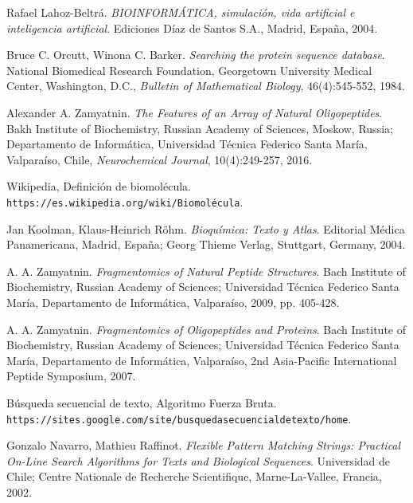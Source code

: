 \documentclass[letterpaper, 10pt, notitlepage]{report}
\begin{document}
\begin{thebibliography}{9}

Rafael Lahoz-Beltrá.
\textit{BIOINFORMÁTICA, simulación, vida artificial e inteligencia artificial}. 
Ediciones Díaz de Santos S.A., Madrid, España, 2004.

Bruce C. Orcutt, Winona C. Barker.
\textit{Searching the protein sequence database}.
National Biomedical Research Foundation, Georgetown University Medical Center,
Washington, D.C., \textit{Bulletin of Mathematical Biology}, 46(4):545-552, 1984.

Alexander A. Zamyatnin.
\textit{The Features of an Array of Natural Oligopeptides}.
Bakh Institute of Biochemistry, Russian Academy of Sciences, Moskow, Russia;
Departamento de Informática, Universidad Técnica Federico Santa María, Valparaíso, Chile,
\textit{Neurochemical Journal}, 10(4):249-257, 2016.

Wikipedia, Definición de biomolécula.
\\\texttt{https://es.wikipedia.org/wiki/Biomolécula}.

Jan Koolman, Klaus-Heinrich Röhm.
\textit{Bioquímica: Texto y Atlas}.
Editorial Médica Panamericana, Madrid, España;
Georg Thieme Verlag, Stuttgart, Germany, 2004.

A. A. Zamyatnin.
\textit{Fragmentomics of Natural Peptide Structures}. 
Bach Institute of Biochemistry, Russian Academy of Sciences;  Universidad Técnica Federico Santa María, Departamento de Informática, Valparaíso, 2009, pp. 405-428.

A. A. Zamyatnin. 
\textit{Fragmentomics of Oligopeptides and Proteins}. 
Bach Institute of Biochemistry, Russian Academy of Sciences;  Universidad Técnica Federico Santa María, Departamento de Informática, Valparaíso, 2nd Asia-Pacific International Peptide Symposium, 2007.

Búsqueda secuencial de texto, Algoritmo Fuerza Bruta.
\\\texttt{https://sites.google.com/site/busquedasecuencialdetexto/home}.

Gonzalo Navarro, Mathieu Raffinot.
\textit{Flexible Pattern Matching Strings: Practical On-Line Search Algorithms for Texts and Biological Sequences}.
Universidad de Chile; Centre Nationale de Recherche Scientifique, Marne-La-Vallee, Francia, 2002.


\end{thebibliography}
\end{document}
